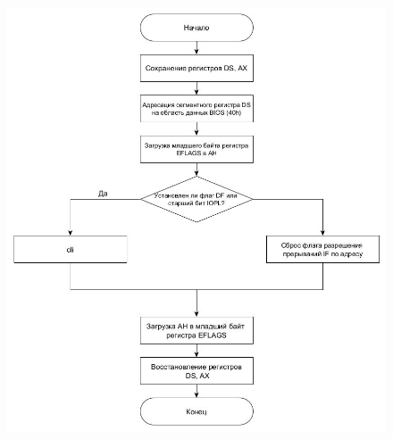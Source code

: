 \begin{figure}[!ht]
	\begin{center}
		\includegraphics[width=16cm]{img/sub.jpg}
	\end{center}
\end{figure}